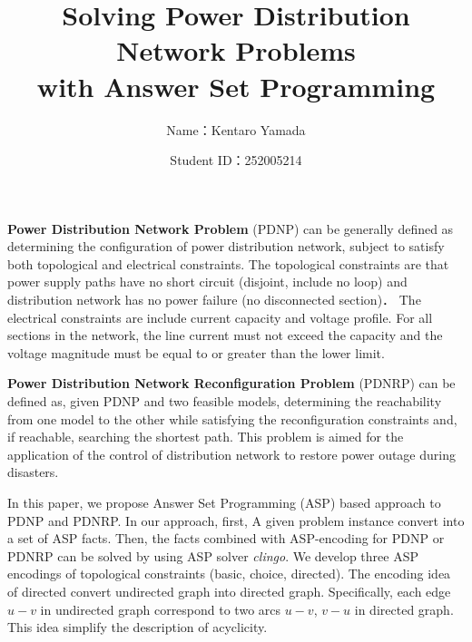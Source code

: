 \documentclass[dvipdfmx,a4paper]{jsarticle}
\title{Solving Power Distribution Network Problems \\ with Answer Set Programming}
\author{Name：Kentaro Yamada}
\date{Student ID：252005214}
\begin{document}
\maketitle

\textbf{Power Distribution Network Problem} (PDNP) can be generally 
defined as determining the configuration of power distribution network,
subject to satisfy both topological and electrical constraints. 
% 
The topological constraints are that power supply paths have
no short circuit (disjoint, include no loop) and
distribution network has no power failure (no disconnected section)．
%
The electrical constraints are include current capacity
and voltage profile.
%
For all sections in the network, the line current must not exceed 
the capacity and the voltage magnitude must be equal to or greater 
than the lower limit.

%

\textbf{Power Distribution Network Reconfiguration Problem} (PDNRP) can be
defined as, given PDNP and two feasible models, determining the reachability
from one model to the other while satisfying the reconfiguration constraints and,
if reachable, searching the shortest path.
%
This problem is aimed for the application  of the control of distribution 
network to restore power outage during disasters.


In this paper, we propose Answer Set Programming (ASP) based approach to
PDNP and PDNRP.
%
In our approach, first, A given problem instance convert into 
a set of ASP facts. 
%
Then, the facts combined with ASP-encoding
for PDNP or PDNRP can be solved by using ASP solver 
\textit{clingo}.
%
We develop three ASP encodings of topological constraints
(\textsf{basic}, \textsf{choice}, \textsf{directed}).
%
The encoding idea of \textsf{directed} convert undirected graph
into directed graph. 
%
Specifically, each edge $u-v$ in undirected graph correspond to 
two arcs $u-v$, $v-u$ in directed graph.
%
This idea simplify the description of acyclicity.
\end{document}
